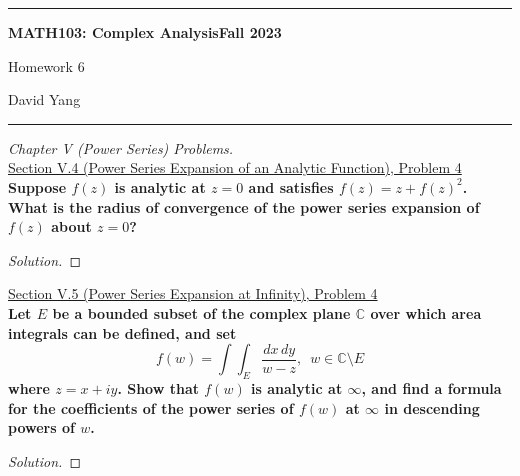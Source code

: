 \documentclass[11pt]{article}
\newcommand{\C}{\mathbb{C}}
\newenvironment{solution}
  {\renewcommand\qedsymbol{$\blacksquare$}\begin{proof}[Solution]}
  {\end{proof}}
\theoremstyle{definition}
\begin{document}
	\hrule
	\begin{center}
        \textbf{MATH103: Complex Analysis}\hfill \textbf{Fall 2023}\newline


		{\Large Homework 6}

		David Yang
	\end{center}

\hrule

\vspace{1em}


\textit{Chapter V (Power Series) Problems.} \\

\underline{Section V.4 (Power Series Expansion of an Analytic Function), Problem 4} \\

\textbf{Suppose $f(z)$ is analytic at $z = 0$ and satisfies $f(z) = z + f(z)^2$. What is the radius of convergence of the power series expansion of $f(z)$ about $z=0$?} 

\begin{solution}

\end{solution}

\underline{Section V.5 (Power Series Expansion at Infinity), Problem 4} \\

\textbf{Let $E$ be a bounded subset of the complex plane $\C$ over which area integrals can be defined, and set}
\[ f(w) = \int\int_{E} \frac{dx \, dy}{w-z}, \, \, \, w \in \C \setminus E \]
\textbf{where $z = x+iy$. Show that $f(w)$ is analytic at $\infty$, and find a formula for the coefficients of the power series of $f(w)$ at 
$\infty$ in descending powers of $w$.}

\begin{solution}

\end{solution}
\end{document}
